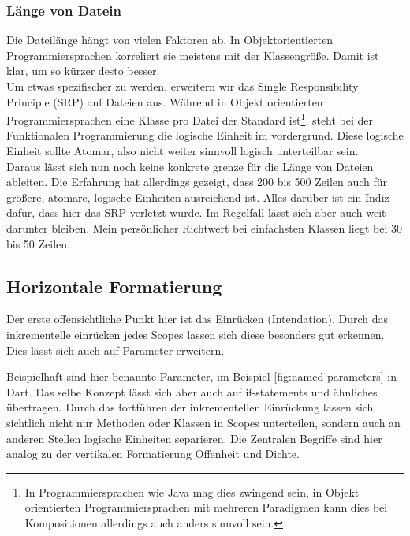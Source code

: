         \subsubsection{Länge von Datein}
            Die Dateilänge hängt von vielen Faktoren ab.
            In Objektorientierten Programmiersprachen korreliert sie meistens mit der Klassengröße.
            Damit ist klar, um so kürzer desto besser.\\
            Um etwas spezifischer zu werden, erweitern wir das Single Responsibility Principle (SRP) auf Dateien aus.
            Während in Objekt orientierten Programmiersprachen eine Klasse pro Datei der Standard ist\footnote{In Programmiersprachen wie Java mag dies zwingend sein, in Objekt orientierten Programmiersprachen mit mehreren Paradigmen kann dies bei Kompositionen allerdings auch anders sinnvoll sein.}, steht bei der Funktionalen Programmierung die logische Einheit im vordergrund.
            Diese logische Einheit sollte Atomar, also nicht weiter sinnvoll logisch unterteilbar sein.\\
            Daraus lässt sich nun noch keine konkrete grenze für die Länge von Dateien ableiten.
            Die Erfahrung hat allerdings gezeigt, dass 200 bis 500 Zeilen auch für größere, atomare, logische Einheiten ausreichend ist.
            Alles darüber ist ein Indiz dafür, dass hier das SRP verletzt wurde.
            Im Regelfall lässt sich aber auch weit darunter bleiben.
            Mein persönlicher Richtwert bei einfachsten Klassen liegt bei 30 bis 50 Zeilen.

    \subsection{Horizontale Formatierung}
        Der erste offensichtliche Punkt hier ist das Einrücken (Intendation).
        Durch das inkrementelle einrücken jedes Scopes lassen sich diese besonders gut erkennen.
        Dies lässt sich auch auf Parameter erweitern.
        
        Beispielhaft sind hier benannte Parameter, im Beispiel \ref{fig:named-parameters} in Dart.
        Das selbe Konzept lässt sich aber auch auf if-statements und ähnliches übertragen.
        Durch das fortführen der inkrementellen Einrückung lassen sich sichtlich nicht nur Methoden oder Klassen in Scopes unterteilen, sondern auch an anderen Stellen logische Einheiten separieren.
        Die Zentralen Begriffe sind hier analog zu der vertikalen Formatierung Offenheit und Dichte.
